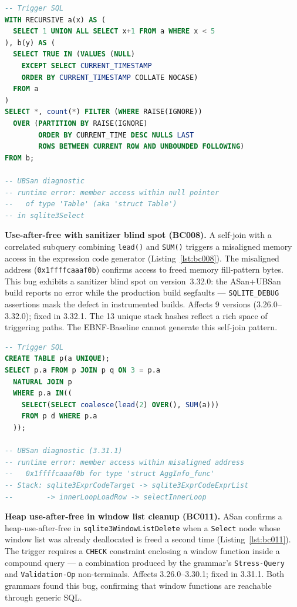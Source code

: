 \begin{lstlisting}[caption={BC010: Null pointer in \texttt{sqlite3Select}.},label={lst:bc010},language=SQL,numbers=none]
-- Trigger SQL
WITH RECURSIVE a(x) AS (
  SELECT 1 UNION ALL SELECT x+1 FROM a WHERE x < 5
), b(y) AS (
  SELECT TRUE IN (VALUES (NULL)
    EXCEPT SELECT CURRENT_TIMESTAMP
    ORDER BY CURRENT_TIMESTAMP COLLATE NOCASE)
  FROM a
)
SELECT *, count(*) FILTER (WHERE RAISE(IGNORE))
  OVER (PARTITION BY RAISE(IGNORE)
        ORDER BY CURRENT_TIME DESC NULLS LAST
        ROWS BETWEEN CURRENT ROW AND UNBOUNDED FOLLOWING)
FROM b;

-- UBSan diagnostic
-- runtime error: member access within null pointer
--   of type 'Table' (aka 'struct Table')
-- in sqlite3Select
\end{lstlisting}

\textbf{Use-after-free with sanitizer blind spot (BC008).} A self-join with a correlated subquery combining \texttt{lead()} and \texttt{SUM()} triggers a misaligned memory access in the expression code generator (Listing~\ref{lst:bc008}). The misaligned address (\texttt{0x1ffffcaaaf0b}) confirms access to freed memory fill-pattern bytes. This bug exhibits a sanitizer blind spot on version~3.32.0: the ASan+UBSan build reports no error while the production build segfaults --- \texttt{SQLITE\_DEBUG} assertions mask the defect in instrumented builds. Affects 9 versions (3.26.0--3.32.0); fixed in 3.32.1. The 13 unique stack hashes reflect a rich space of triggering paths. The EBNF-Baseline cannot generate this self-join pattern.

\begin{lstlisting}[caption={BC008: Use-after-free in \texttt{sqlite3ExprCodeTarget}.},label={lst:bc008},language=SQL,numbers=none]
-- Trigger SQL
CREATE TABLE p(a UNIQUE);
SELECT p.a FROM p JOIN p q ON 3 = p.a
  NATURAL JOIN p
  WHERE p.a IN((
    SELECT(SELECT coalesce(lead(2) OVER(), SUM(a)))
    FROM p d WHERE p.a
  ));

-- UBSan diagnostic (3.31.1)
-- runtime error: member access within misaligned address
--   0x1ffffcaaaf0b for type 'struct AggInfo_func'
-- Stack: sqlite3ExprCodeTarget -> sqlite3ExprCodeExprList
--        -> innerLoopLoadRow -> selectInnerLoop
\end{lstlisting}

\textbf{Heap use-after-free in window list cleanup (BC011).} ASan confirms a heap-use-after-free in \texttt{sqlite3WindowListDelete} when a \texttt{Select} node whose window list was already deallocated is freed a second time (Listing~\ref{lst:bc011}). The trigger requires a \texttt{CHECK} constraint enclosing a window function inside a compound query --- a combination produced by the grammar's \texttt{Stress-Query} and \texttt{Validation-Op} non-terminals. Affects 3.26.0--3.30.1; fixed in 3.31.1. Both grammars found this bug, confirming that window functions are reachable through generic SQL.

